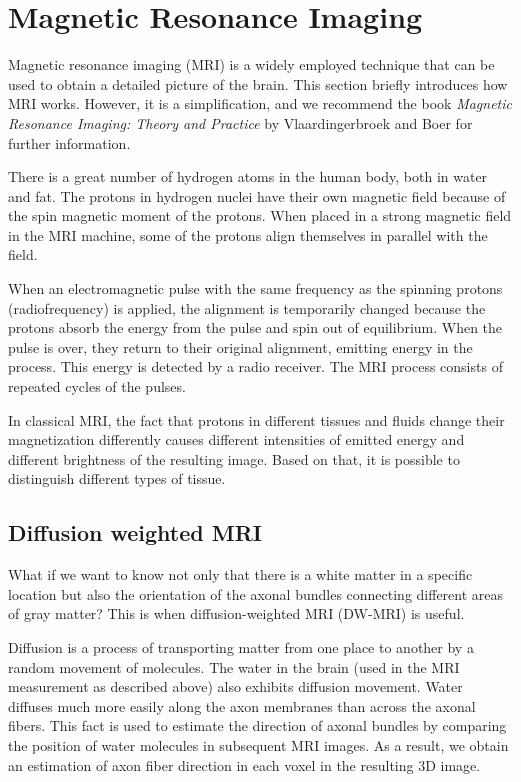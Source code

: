 \section{Magnetic Resonance Imaging}\label{sec:MRI}

Magnetic resonance imaging (MRI) is a widely employed technique that can be used to obtain a detailed picture of the brain. This section briefly introduces how MRI works. However, it is a simplification, and we recommend the book \textit{Magnetic Resonance Imaging: Theory and Practice} by Vlaardingerbroek and Boer for further information. \cite{vlaardingerbroek_magnetic_2003,bear_neuroscience_2016}

There is a great number of hydrogen atoms in the human body, both in water and fat. The protons in hydrogen nuclei have their own magnetic field because of the spin magnetic moment of the protons. When placed in a strong magnetic field in the MRI machine, some of the protons align themselves in parallel with the field. \cite{cizkova_comparing_2022}

When an electromagnetic pulse with the same frequency as the spinning protons (radiofrequency) is applied, the alignment is temporarily changed because the protons absorb the energy from the pulse and spin out of equilibrium. When the pulse is over, they return to their original alignment, emitting energy in the process. This energy is detected by a radio receiver. The MRI process consists of repeated cycles of the pulses.\cite{bear_neuroscience_2016,cizkova_comparing_2022}

In classical MRI, the fact that protons in different tissues and fluids change their magnetization differently causes different intensities of emitted energy and different brightness of the resulting image. Based on that, it is possible to distinguish different types of tissue. \cite{bear_neuroscience_2016,cizkova_comparing_2022}

\subsection{Diffusion weighted MRI}

What if we want to know not only that there is a white matter in a specific location but also the orientation of the axonal bundles connecting different areas of gray matter? This is when diffusion-weighted MRI (DW-MRI) is useful.

Diffusion is a process of transporting matter from one place to another by a random movement of molecules. The water in the brain (used in the MRI measurement as described above) also exhibits diffusion movement. Water diffuses much more easily along the axon membranes than across the axonal fibers. This fact is used to estimate the direction of axonal bundles by comparing the position of water molecules in subsequent MRI images. As a result, we obtain an estimation of axon fiber direction in each voxel in the resulting 3D image. \cite{bear_neuroscience_2016,jones_diffusion_2011,calamante_seven_2019}

